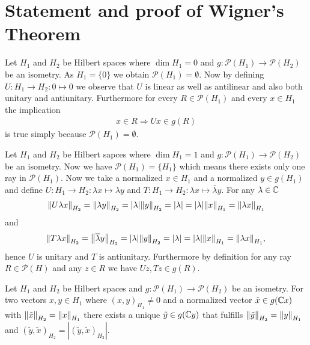 \section{Statement and proof of Wigner's Theorem}

\begin{example} \label{example:zerodim}
	Let $H_1$ and $H_2$ be Hilbert spaces where $\dim H_1 = 0$ and $g: \mathcal{P}(H_1) \to \mathcal{P}(H_2)$ be an isometry. As $H_1 = \{0\}$ we obtain $\mathcal{P}(H_1) = \emptyset$. Now by defining $U: H_1 \to H_2: 0 \mapsto 0$ we observe that $U$ is linear as well as antilinear and also both unitary and antiunitary. Furthermore for every $R \in \mathcal{P}(H_1)$ and every $x \in H_1$ the implication 
	\begin{align*}
		x \in R \Rightarrow Ux \in g(R)
	\end{align*} 
	is true simply because $\mathcal{P}(H_1) = \emptyset$.
\end{example}

\begin{example} \label{example:onedim}
	Let $H_1$ and $H_2$ be Hilbert sapces where $\dim H_1 = 1$ and $g: \mathcal{P}(H_1) \to \mathcal{P}(H_2)$ be an isometry. Now we have $\mathcal{P}(H_1) = \{H_1\}$ which means there exists only one ray in $\mathcal{P}(H_1)$. Now we take a normalized $x \in H_1$ and a normalized $y \in g(H_1)$ and define $U: H_1 \to H_2: \lambda x \mapsto \lambda y$ and $T: H_1 \to H_2: \lambda x \mapsto \overline{\lambda} y$. For any $\lambda \in \C$
	\begin{align*}
		\norm[H_2]{U\lambda x} = \norm[H_2]{\lambda y} = \vbraces{\lambda} \norm[H_2]{y} = \vbraces{\lambda} = \vbraces{\lambda} \norm[H_1]{x} = \norm[H_1]{\lambda x}
	\end{align*}
	and 
	\begin{align*}
		\norm[H_2]{T\lambda x} = \norm[H_2]{\overline{\lambda} y} = \vbraces{\lambda} \norm[H_2]{y} = \vbraces{\lambda} = \vbraces{\lambda} \norm[H_1]{x} = \norm[H_1]{\lambda x},
	\end{align*}
	hence $U$ is unitary and $T$ is antiunitary. Furthermore by definition for any ray $R \in \mathcal{P}(H)$ and any $z \in R$ we have $Uz, Tz \in g(R)$. 
\end{example}

\begin{lemma} \label{lemma:phase_adjustment_ray}
	Let $H_1$ and $H_2$ be Hilbert spaces and $g: \mathcal{P}(H_1) \to \mathcal{P}(H_2)$ be an isometry. For two vectors $x,y \in H_1$ where $(x,y)_{H_1} \neq 0$ and a normalized vector $\tilde{x} \in g(\C x)$ with $\norm[H_2]{\tilde{x}} = \norm[H_1]{x}$ there exists a unique $\tilde{y} \in g(\C y)$ that fulfills $\norm[H_2]{\tilde{y}} = \norm[H_1]{y}$ and $(\tilde{y},\tilde{x})_{H_2} = |(\tilde{y},\tilde{x})_{H_2}| $.
\end{lemma}

